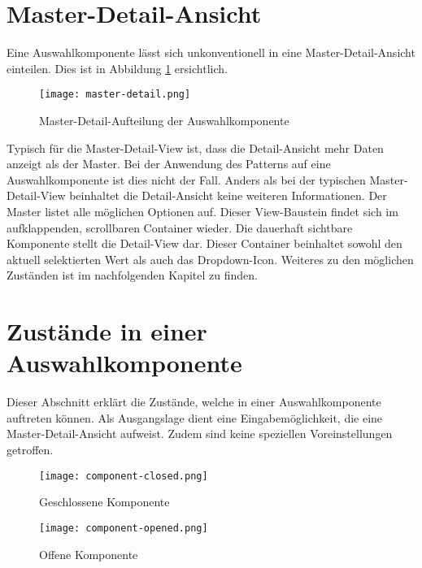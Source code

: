 \section{Master-Detail-Ansicht}
\label{sec:masterDetailView}

Eine Auswahlkomponente lässt sich unkonventionell in eine Master-Detail-Ansicht einteilen. 
Dies ist in Abbildung \ref{img:masterDetailView} ersichtlich. 

\begin{figure}[!htb]
    \centering
    \texttt{[image: master-detail.png]}
    \caption{\centering Master-Detail-Aufteilung der Auswahlkomponente}
    \label{img:masterDetailView}
\end{figure}

Typisch für die Master-Detail-View ist, dass die Detail-Ansicht mehr Daten anzeigt als der Master. 
Bei der Anwendung des Patterns auf eine Auswahlkomponente ist dies nicht der Fall. 
Anders als bei der typischen Master-Detail-View beinhaltet die Detail-Ansicht keine weiteren Informationen. 
Der Master listet alle möglichen Optionen auf. 
Dieser View-Baustein findet sich im aufklappenden, scrollbaren Container wieder. 
Die dauerhaft sichtbare Komponente stellt die Detail-View dar. 
Dieser Container beinhaltet sowohl den aktuell selektierten Wert als auch das Dropdown-Icon. 
Weiteres zu den möglichen Zuständen ist im nachfolgenden Kapitel zu finden. 


\section{Zustände in einer Auswahlkomponente}
\label{sec:states}

Dieser Abschnitt erklärt die Zustände, welche in einer Auswahlkomponente auftreten können. 
Als Ausgangslage dient eine Eingabemöglichkeit, die eine Master-Detail-Ansicht aufweist. 
Zudem sind keine speziellen Voreinstellungen getroffen. 

\begin{figure}[!htb]
    \centering
    \begin{minipage}[b]{0.4\textwidth}
        \centering
        \texttt{[image: component-closed.png]}
        \caption{\centering Geschlossene Komponente}
        \label{img:componentClose}
    \end{minipage}
    \hfill
    \begin{minipage}[b]{0.55\textwidth}
        \centering
        \texttt{[image: component-opened.png]}
        \caption{\centering Offene Komponente}
        \label{img:componentOpen}
    \end{minipage}
\end{figure}


